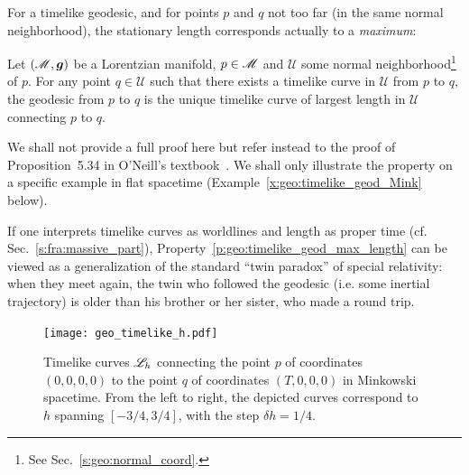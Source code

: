 For a timelike geodesic, and for points $p$ and $q$ not too far (in the same
normal neighborhood),
the stationary length corresponds actually to a \emph{maximum}:
\begin{prop}
\label{p:geo:timelike_geod_max_length}
Let $(\mathscr{M},\bm{g})$ be a Lorentzian manifold, $p\in\mathscr{M}$ and $\mathscr{U}$ some
normal neighborhood\footnote{See Sec.~\ref{s:geo:normal_coord}.} of $p$. For any point $q\in\mathscr{U}$
such that there exists a timelike curve in $\mathscr{U}$ from $p$ to $q$,
the geodesic from $p$ to $q$ is the unique timelike curve of largest length
in $\mathscr{U}$ connecting $p$ to $q$.
\end{prop}
We shall not provide a full proof here but refer instead to
the proof of Proposition~5.34 in O'Neill's textbook~\cite{ONeil83}.
We shall only illustrate the property on a specific example in flat spacetime
(Example~\ref{x:geo:timelike_geod_Mink} below).

If one interprets timelike curves as worldlines and length as proper time
(cf. Sec.~\ref{s:fra:massive_part}), Property~\ref{p:geo:timelike_geod_max_length}
can be viewed as a generalization of the standard ``twin paradox''
of special relativity: when they meet again, the twin who followed the geodesic (i.e. some
inertial trajectory)
is older than his brother or her sister, who made a round trip.

\begin{figure}
\centerline{\texttt{[image: geo\_timelike\_h.pdf]}}
\caption[]{\label{f:geo:timelike_h} \footnotesize
Timelike curves $\mathscr{L}_h$ connecting the point $p$
of coordinates $(0,0,0,0)$ to the point $q$ of coordinates $(T,0,0,0)$
in Minkowski spacetime. From the left to right, the depicted curves
correspond to $h$ spanning $[-3/4, 3/4]$, with the step $\delta h = 1/4$.}
\end{figure}


